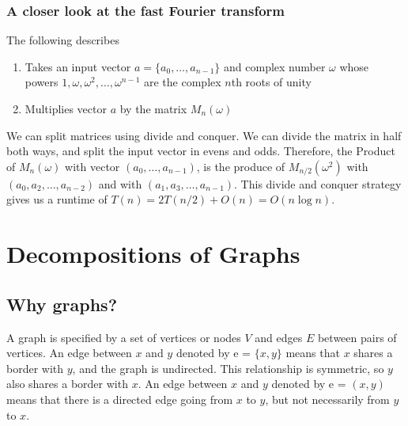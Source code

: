 \subsubsection{A closer look at the fast Fourier transform}
The following describes 
\begin{enumerate}
  \item Takes an input vector $a = \{a_0, \dots, a_{n-1}\}$ and complex number $\omega$ whose powers $1, \omega, \omega^2, \dots, \omega^{n-1}$ are the complex $n$th roots of unity
  \item Multiplies vector $a$ by the matrix $M_n(\omega)$
\end{enumerate}
We can split matrices using divide and conquer.
We can divide the matrix in half both ways, and split the input vector in evens and odds.
Therefore, the Product of $M_n(\omega)$ with vector $(a_0, \dots, a_{n-1})$, is the produce of $M_{n/2}(\omega^2)$ with $(a_0, a_2, \dots, a_{n-2})$ and with $(a_1, a_3, \dots, a_{n-1})$.
This divide and conquer strategy gives us a runtime of $T(n) = 2T(n/2) + O(n) = O(n \log n)$.

\pagebreak

\section{Decompositions of Graphs}

\subsection{Why graphs?}
A graph is specified by a set of vertices or nodes $V$ and edges $E$ between pairs of vertices.
An edge between $x$ and $y$ denoted by e = $\{x, y\}$ means that $x$ shares a border with $y$, and the graph is undirected.
This relationship is symmetric, so $y$ also shares a border with $x$.
An edge between $x$ and $y$ denoted by e = $(x, y)$ means that there is a directed edge going from $x$ to $y$, but not necessarily from $y$ to $x$.


